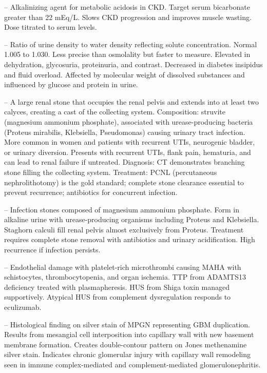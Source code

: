 -- Alkalinizing agent for metabolic acidosis in CKD. Target serum bicarbonate greater than 22 mEq/L. Slows CKD progression and improves muscle wasting. Dose titrated to serum levels.

-- Ratio of urine density to water density reflecting solute concentration. Normal 1.005 to 1.030. Less precise than osmolality but faster to measure. Elevated in dehydration, glycosuria, proteinuria, and contrast. Decreased in diabetes insipidus and fluid overload. Affected by molecular weight of dissolved substances and influenced by glucose and protein in urine.

-- A large renal stone that occupies the renal pelvis and extends into at least two calyces, creating a cast of the collecting system. Composition: struvite (magnesium ammonium phosphate), associated with urease-producing bacteria (Proteus mirabilis, Klebsiella, Pseudomonas) causing urinary tract infection. More common in women and patients with recurrent UTIs, neurogenic bladder, or urinary diversion. Presents with recurrent UTIs, flank pain, hematuria, and can lead to renal failure if untreated. Diagnosis: CT demonstrates branching stone filling the collecting system. Treatment: PCNL (percutaneous nephrolithotomy) is the gold standard; complete stone clearance essential to prevent recurrence; antibiotics for concurrent infection.

-- Infection stones composed of magnesium ammonium phosphate. Form in alkaline urine with urease-producing organisms including Proteus and Klebsiella. Staghorn calculi fill renal pelvis almost exclusively from Proteus. Treatment requires complete stone removal with antibiotics and urinary acidification. High recurrence if infection persists.

-- Endothelial damage with platelet-rich microthrombi causing MAHA with schistocytes, thrombocytopenia, and organ ischemia. TTP from ADAMTS13 deficiency treated with plasmapheresis. HUS from Shiga toxin managed supportively. Atypical HUS from complement dysregulation responds to eculizumab.

-- Histological finding on silver stain of MPGN representing GBM duplication. Results from mesangial cell interposition into capillary wall with new basement membrane formation. Creates double-contour pattern on Jones methenamine silver stain. Indicates chronic glomerular injury with capillary wall remodeling seen in immune complex-mediated and complement-mediated glomerulonephritis.

